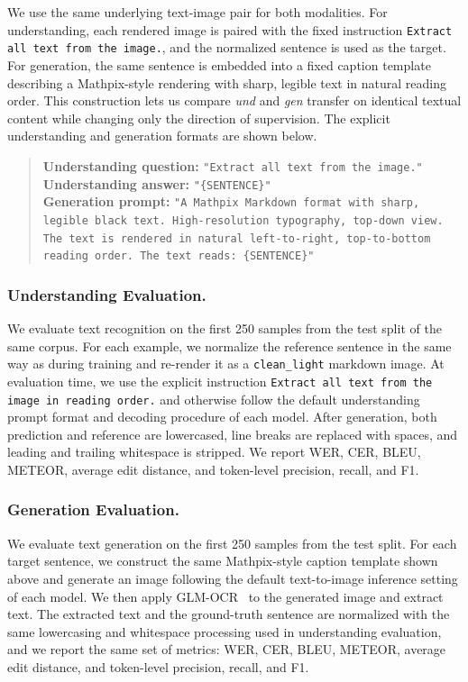 We use the same underlying text-image pair for both modalities. For understanding, each rendered image is paired with the fixed instruction \texttt{Extract all text from the image.}, and the normalized sentence is used as the target. For generation, the same sentence is embedded into a fixed caption template describing a Mathpix-style rendering with sharp, legible text in natural reading order. This construction lets us compare \textit{und} and \textit{gen} transfer on identical textual content while changing only the direction of supervision. The explicit understanding and generation formats are shown below.

\begin{quote}
\textbf{Understanding question:} \texttt{"Extract all text from the image."} \\
\textbf{Understanding answer:} \texttt{"\{SENTENCE\}"} \\
\textbf{Generation prompt:} \texttt{"A Mathpix Markdown format with sharp, legible black text. High-resolution typography, top-down view. The text is rendered in natural left-to-right, top-to-bottom reading order. The text reads: \{SENTENCE\}"} \\
\end{quote}

\subsubsection{Understanding Evaluation.} We evaluate text recognition on the first 250 samples from the test split of the same corpus. For each example, we normalize the reference sentence in the same way as during training and re-render it as a \texttt{clean\_light} markdown image. At evaluation time, we use the explicit instruction \texttt{Extract all text from the image in reading order.} and otherwise follow the default understanding prompt format and decoding procedure of each model. After generation, both prediction and reference are lowercased, line breaks are replaced with spaces, and leading and trailing whitespace is stripped. We report WER, CER, BLEU, METEOR, average edit distance, and token-level precision, recall, and F1.

\subsubsection{Generation Evaluation.} We evaluate text generation on the first 250 samples from the test split. For each target sentence, we construct the same Mathpix-style caption template shown above and generate an image following the default text-to-image inference setting of each model. We then apply GLM-OCR~\cite{glm_ocr} to the generated image and extract text. The extracted text and the ground-truth sentence are normalized with the same lowercasing and whitespace processing used in understanding evaluation, and we report the same set of metrics: WER, CER, BLEU, METEOR, average edit distance, and token-level precision, recall, and F1.

